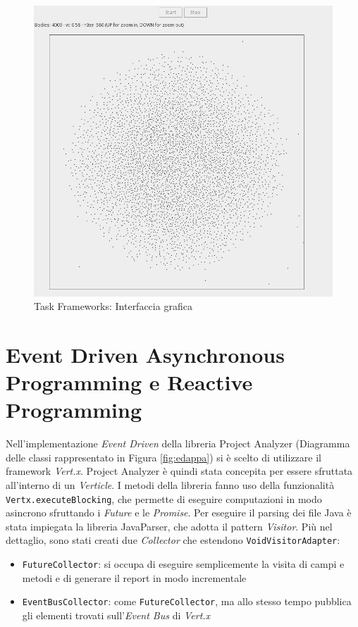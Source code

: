 \documentclass[12pt,a4paper,openright,twoside]{book}
\begin{document}
\begin{figure}[H]
	\centering
	\includegraphics[width=\linewidth]{figures/simulation.png}
	\caption{Task Frameworks: Interfaccia grafica}
	\label{fig:tfgui}
\end{figure}

\section{Event Driven Asynchronous Programming e Reactive Programming}
Nell'implementazione \textit{Event Driven} della libreria Project Analyzer (Diagramma delle classi rappresentato in Figura \ref{fig:edappa}) si è scelto di utilizzare il framework \textit{Vert.x}.
Project Analyzer è quindi stata concepita per essere sfruttata all'interno di un \textit{Verticle}.
I metodi della libreria fanno uso della funzionalità \texttt{Vertx.executeBlocking}, che permette di eseguire computazioni in modo asincrono sfruttando i \textit{Future} e le \textit{Promise}.
Per eseguire il parsing dei file Java è stata impiegata la libreria JavaParser, che adotta il pattern \textit{Visitor}.
Più nel dettaglio, sono stati creati due \textit{Collector} che estendono \texttt{VoidVisitorAdapter}:
\begin{itemize}
    \item \texttt{FutureCollector}: si occupa di eseguire semplicemente la visita di campi e metodi e di generare il report in modo incrementale
    \item \texttt{EventBusCollector}: come \texttt{FutureCollector}, ma allo stesso tempo pubblica gli elementi trovati sull'\textit{Event Bus} di \textit{Vert.x}
\end{itemize}
\end{document}
